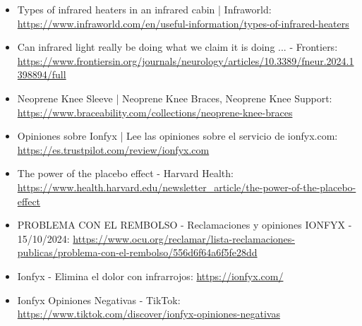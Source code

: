 \documentclass{article}
\begin{document}
\begin{itemize}
    \item Types of infrared heaters in an infrared cabin | Infraworld: {\small\url{https://www.infraworld.com/en/useful-information/types-of-infrared-heaters}}
    \item Can infrared light really be doing what we claim it is doing ... - Frontiers: {\small\url{https://www.frontiersin.org/journals/neurology/articles/10.3389/fneur.2024.1398894/full}}
    \item Neoprene Knee Sleeve | Neoprene Knee Braces, Neoprene Knee Support: {\small\url{https://www.braceability.com/collections/neoprene-knee-braces}}
    \item Opiniones sobre Ionfyx | Lee las opiniones sobre el servicio de ionfyx.com: {\small\url{https://es.trustpilot.com/review/ionfyx.com}}
    \item The power of the placebo effect - Harvard Health: {\small\url{https://www.health.harvard.edu/newsletter_article/the-power-of-the-placebo-effect}}
    \item PROBLEMA CON EL REMBOLSO - Reclamaciones y opiniones IONFYX - 15/10/2024: {\small\url{https://www.ocu.org/reclamar/lista-reclamaciones-publicas/problema-con-el-rembolso/556d6f64a6f5fe28dd}}
    \item Ionfyx - Elimina el dolor con infrarrojos: {\small\url{https://ionfyx.com/}}
    \item Ionfyx Opiniones Negativas - TikTok: {\small\url{https://www.tiktok.com/discover/ionfyx-opiniones-negativas}}
\end{itemize}
\end{document}
